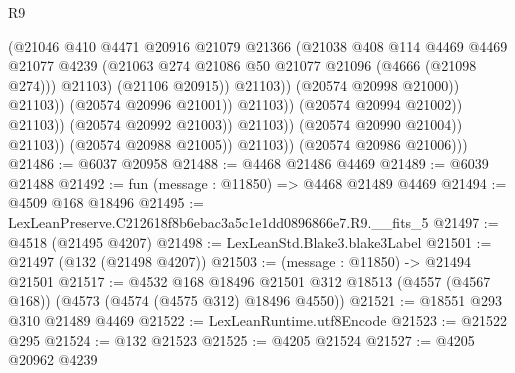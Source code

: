 \begin{lexlean}{R9}
\begin{coremodule}
                                                (@21046
                                                  @410
                                                  @4471
                                                  @20916
                                                  @21079
                                                  @21366
                                                  (@21038
                                                    @408
                                                    @114
                                                    @4469
                                                    @4469
                                                    @21077
                                                    @4239
                                                    (@21063
                                                      @274
                                                      @21086
                                                      @50
                                                      @21077
                                                      @21096
                                                      (@4666 (@21098 @274)))
                                                    @21103)
                                                  (@21106 @20915))
                                                @21103))
                                            (@20574 @20998 @21000))
                                          @21103))
                                      (@20574 @20996 @21001))
                                    @21103))
                                (@20574 @20994 @21002))
                              @21103))
                          (@20574 @20992 @21003))
                        @21103))
                    (@20574 @20990 @21004))
                  @21103))
              (@20574 @20988 @21005))
            @21103))
        (@20574 @20986 @21006)))
@21486 := @6037 @20958
@21488 := @4468 @21486 @4469
@21489 := @6039 @21488
@21492 := fun (message : @11850) => @4468 @21489 @4469
@21494 := @4509 @168 @18496
@21495 := LexLeanPreserve.C212618f8b6ebac3a5c1e1dd0896866e7.R9.__fits_5
@21497 := @4518 (@21495 @4207)
@21498 := LexLeanStd.Blake3.blake3Label
@21501 := @21497 (@132 (@21498 @4207))
@21503 := (message : @11850) -> @21494 @21501
@21517 := @4532
    @168
    @18496
    @21501
    @312
    @18513
    (@4557 (@4567 @168))
    (@4573 (@4574 (@4575 @312) @18496 @4550))
@21521 := @18551 @293 @310 @21489 @4469
@21522 := LexLeanRuntime.utf8Encode
@21523 := @21522 @295
@21524 := @132 @21523
@21525 := @4205 @21524
@21527 := @4205 @20962 @4239

\end{coremodule}
\end{lexlean}
